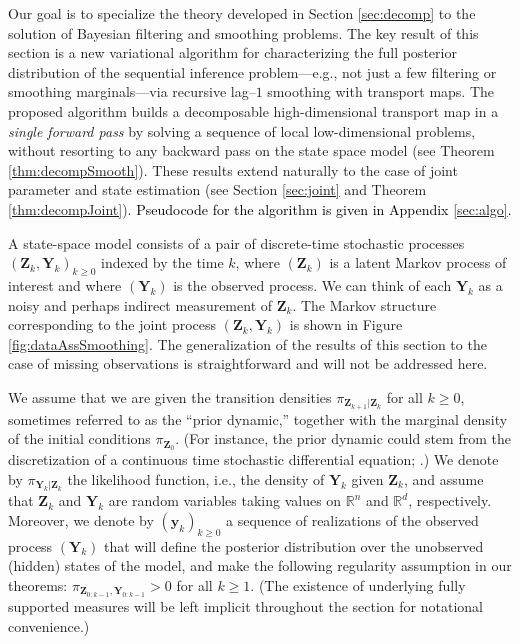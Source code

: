 \documentclass[twoside,11pt]{article}
\newcommand{\re}{\mathbb{R}}
\newcommand{\Yb}{\boldsymbol{Y}}
\newcommand{\yb}{\boldsymbol{y}}
\newcommand{\Zb}{\boldsymbol{Z}}
\newcommand{\ddata}{d} %
\newcommand{\hrevone}{\textcolor{black} }
\begin{document}
Our goal is to specialize the theory developed in Section
\ref{sec:decomp} %
to the solution of Bayesian filtering and smoothing problems.
%
%
%
%
%
%
%
%
%
%
%
%
%
%
%
%
%
The key result of this section is a new variational %
algorithm for characterizing the full posterior distribution of the
sequential inference problem---e.g., not just a few filtering or smoothing
marginals---via recursive lag--$1$ smoothing with transport maps. The
proposed algorithm builds a decomposable high-dimensional transport map in
a \emph{single forward pass} by solving a sequence of local
low-dimensional problems, without resorting to any backward pass on
the state space model (see Theorem \ref{thm:decompSmooth}).  These
results extend naturally to the case of joint parameter and state
estimation (see Section \ref{sec:joint} and Theorem
\ref{thm:decompJoint}).
\hrevone{
Pseudocode for the algorithm is given in Appendix \ref{sec:algo}.
}

A state-space model consists of a pair of discrete-time stochastic
processes $(\Zb_k,\Yb_k)_{k\ge 0}$ indexed by the time $k$, where
$(\Zb_k)$ is a latent
%
Markov process of interest
%
%
%
%
%
%
%
and where $(\Yb_k)$ is the observed process.
%
We can think of each $\Yb_k$ as a noisy and perhaps indirect measurement of $\Zb_k$.
The Markov structure corresponding to the joint process $(\Zb_k,\Yb_k)$ 
is shown in Figure \ref{fig:dataAssSmoothing}.
The generalization of the results of this section to the case of missing
observations is straightforward and will not be addressed here.
%
%
%

We assume that we are given the transition densities
$\pi_{\Zb_{k+1}\vert \Zb_k}$ for all
$k\ge0$, sometimes 
referred to as the ``prior dynamic,'' together with 
the marginal 
density
%
of the initial conditions $\pi_{\Zb_{0}}$.
(For instance, the prior dynamic could stem from the discretization of a 
continuous time stochastic differential equation;
\citealp{oksendal2013stochastic}.)
%
%
%
We denote by $\pi_{\Yb_k \vert \Zb_k }$ the likelihood function, i.e., the
density of $\Yb_k$ given $\Zb_k$, and
%
assume that $\Zb_k$ and
$\Yb_k$ are
random variables taking values on $\re^n$
and $\re^{\ddata}$, respectively.
Moreover, we denote by $(\yb_k)_{k \ge 0}$ a sequence of realizations of the
observed process $(\Yb_k)$ that will define the posterior
distribution over the unobserved ({hidden}) states of the model, and make the
following regularity assumption in our theorems:
$\pi_{\Zb_{0:k-1}, \Yb_{0:k-1}} > 0$
%
%
for all $k\ge 1$.
(The existence of underlying fully supported measures will be left implicit throughout
the section for notational convenience.)
%
\end{document}
